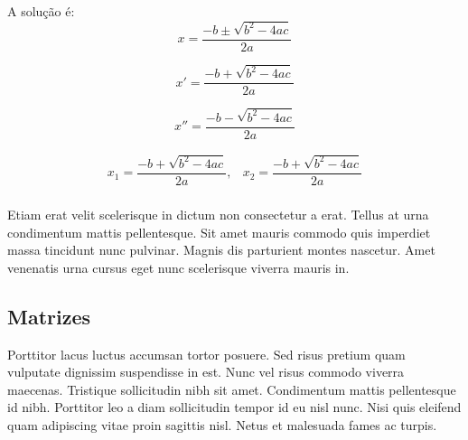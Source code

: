 \documentclass[12pt]{article}
\begin{document}
				A solução é:
				\begin{equation} %
					x = \frac{-b \pm \sqrt{b^2 -4ac}}{2a}
				\end{equation}
				
				\begin{equation*} %
					x' = \frac{-b + \sqrt{b^2 -4ac}}{2a}
				\end{equation*}
				
				\begin{equation} %
					x'' = \frac{-b - \sqrt{b^2 -4ac}}{2a}
				\end{equation}
				
				\begin{equation*}
					\begin{array}{cc}
						x_1 = \dfrac{-b + \sqrt{b^2 -4ac}}{2a}, & %
						x_2 = \dfrac{-b + \sqrt{b^2 -4ac}}{2a} \\ 
					\end{array}
				\end{equation*} 
				
				Etiam erat velit scelerisque in dictum non consectetur a erat. Tellus at urna condimentum mattis pellentesque. Sit amet mauris commodo quis imperdiet massa tincidunt nunc pulvinar. Magnis dis parturient montes nascetur. Amet venenatis urna cursus eget nunc scelerisque viverra mauris in. 
				\newpage
			\subsection{Matrizes}
				Porttitor lacus luctus accumsan tortor posuere. Sed risus pretium quam vulputate dignissim suspendisse in est. Nunc vel risus commodo viverra maecenas. Tristique sollicitudin nibh sit amet. Condimentum mattis pellentesque id nibh. Porttitor leo a diam sollicitudin tempor id eu nisl nunc. Nisi quis eleifend quam adipiscing vitae proin sagittis nisl. Netus et malesuada fames ac turpis. 
 				
\end{document}
